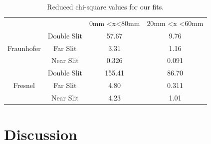 \documentclass[prb,preprint]{revtex4-1}
\begin{document}
\begin{table}[h!]
\centering
\caption{Reduced chi-square values for our fits. }
\begin{ruledtabular}
\begin{tabular}{cccc}
                            &             & 0mm \textless x\textless 80mm & 20mm \textless x \textless 60mm \\
\multirow{3}{*}{Fraunhofer} & Double Slit &57.67                      & 9.76                         \\
                            & Far Slit    & 3.31                       & 1.16                        \\
                            & Near Slit   & 0.326                       &        0.091           \\
\multirow{3}{*}{Fresnel}    & Double Slit &          155.41               & 86.70                         \\
                            & Far Slit    & 4.80                       & 0.311                         \\
                            & Near Slit   & 4.23                       &1.01                       
\end{tabular}
\end{ruledtabular}
\label{chi-square}
\end{table}


\section{Discussion}
\end{document}
